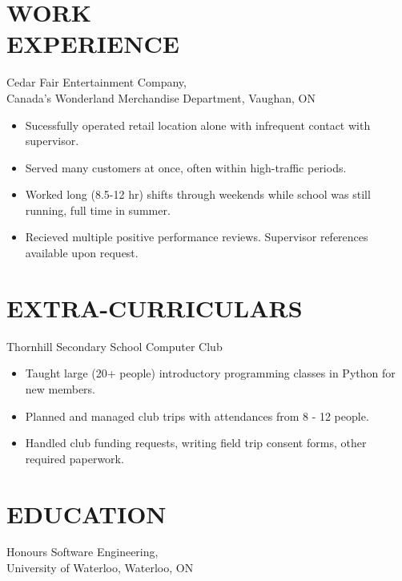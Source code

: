 \documentclass[11pt, margin]{res}
\begin{document}
\begin{resume}
\section{WORK \\ EXPERIENCE} 
                Cedar Fair Entertainment Company, \\
                Canada's Wonderland Merchandise Department, Vaughan, ON 
                
                \begin{itemize}[itemsep=-2pt]
                    \item Sucessfully operated retail location alone with infrequent contact with supervisor.
                    \item Served many customers at once, often within high-traffic periods.
                    \item Worked long (8.5-12 hr) shifts through weekends while school was still running, full time in summer.
                    \item Recieved multiple positive performance reviews. Supervisor references available upon request.
                \end{itemize}
 
\section{EXTRA-CURRICULARS}             
            Thornhill Secondary School Computer Club
            \begin{itemize}[itemsep=-2pt]
                \item Taught large (20+ people) introductory programming classes in Python for new members.
                \item Planned and managed club trips with attendances from 8 - 12 people.
                \item Handled club funding requests, writing field trip consent forms, other required paperwork.
            \end{itemize}



\section{EDUCATION} 
                    Honours Software Engineering, \\
                    University of Waterloo, Waterloo, ON


\end{resume}
\end{document}
